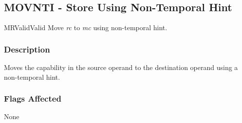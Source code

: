 \clearpage
{}
{}
\subsection*{MOVNTI - Store Using Non-Temporal Hint}

\begin{x86opcodetable}
  {MR}{Valid}{Valid}
  {Move \emph{rc} to \emph{mc} using non-temporal hint.}
\end{x86opcodetable}

\begin{x86opentable}
\end{x86opentable}

\subsubsection*{Description}

Moves the capability in the source operand to the destination operand
using a non-temporal hint.

\subsubsection*{Flags Affected}

None
